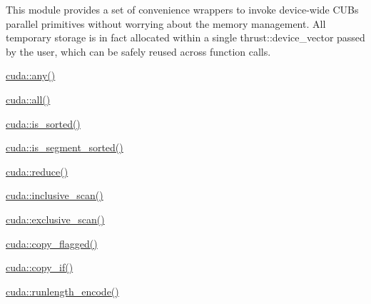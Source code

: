 This module provides a set of convenience wrappers to invoke device-\/wide C\+UB\textquotesingle{}s parallel primitives without worrying about the memory management. All temporary storage is in fact allocated within a single thrust\+::device\+\_\+vector passed by the user, which can be safely reused across function calls.


\begin{DoxyItemize}
\item \hyperlink{group___primitives_ga71416af3e5407b31c78a10026520dbed}{cuda\+::any()}
\item \hyperlink{group___primitives_gaa98aa06ec6a5f38dda15d74ce0c47d57}{cuda\+::all()}
\item \hyperlink{group___primitives_gaec6f4aab196d418865686901c11a093c}{cuda\+::is\+\_\+sorted()}
\item \hyperlink{group___primitives_ga5e6eb75d00ed617295bcee0b1db0ee3e}{cuda\+::is\+\_\+segment\+\_\+sorted()}
\item \hyperlink{group___primitives_gab8f49b135164aaef1fb6b51b90874915}{cuda\+::reduce()}
\item \hyperlink{group___primitives_ga6c5ea5be5565ce7aa2c99b3e602a7cb7}{cuda\+::inclusive\+\_\+scan()}
\item \hyperlink{group___primitives_ga1394066fd7b6215bcae781ca56cae872}{cuda\+::exclusive\+\_\+scan()}
\item \hyperlink{group___primitives_gaafc4aac8b44cf750c98a3a97fe72e5c6}{cuda\+::copy\+\_\+flagged()}
\item \hyperlink{group___primitives_ga536856eaa09125bec01892d565a49f8e}{cuda\+::copy\+\_\+if()}
\item \hyperlink{group___primitives_gae48c0c95572ea1dd13ec562eed6e2755}{cuda\+::runlength\+\_\+encode()} 
\end{DoxyItemize}